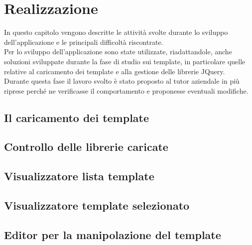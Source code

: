 
\chapter{Realizzazione}
\label{cap:realizzazione}
In questo capitolo vengono descritte le attività svolte durante lo sviluppo dell'applicazione e le principali difficoltà riscontrate.\\
Per lo sviluppo dell'applicazione sono state utilizzate, riadattandole, anche soluzioni sviluppate durante la fase di studio sui template, in particolare quelle relative al caricamento dei template e alla gestione delle librerie JQuery.\\
Durante questa fase il lavoro svolto è stato proposto al tutor aziendale in più riprese perché ne verificasse il comportamento e proponesse eventuali modifiche.

\section{Il caricamento dei template}

\section{Controllo delle librerie caricate}

\section{Visualizzatore lista template}

\section{Visualizzatore template selezionato}

\section{Editor per la manipolazione del template}
